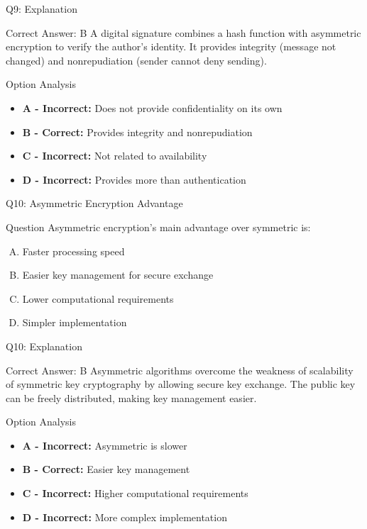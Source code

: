 \documentclass{beamer}
\begin{document}
	\begin{frame}{Q9: Explanation}
		\begin{block}{Correct Answer: B}
			A digital signature combines a hash function with asymmetric encryption to verify the author's identity. It provides integrity (message not changed) and nonrepudiation (sender cannot deny sending).
		\end{block}
		\begin{block}{Option Analysis}
			\begin{itemize}
				\item \textbf{A - Incorrect:} Does not provide confidentiality on its own
				\item \textbf{B - Correct:} Provides integrity and nonrepudiation
				\item \textbf{C - Incorrect:} Not related to availability
				\item \textbf{D - Incorrect:} Provides more than authentication
			\end{itemize}
		\end{block}
	\end{frame}
	
	\begin{frame}{Q10: Asymmetric Encryption Advantage}
		\begin{block}{Question}
			Asymmetric encryption's main advantage over symmetric is:
		\end{block}
		\begin{enumerate}[(A)]
			\item Faster processing speed
			\item Easier key management for secure exchange
			\item Lower computational requirements
			\item Simpler implementation
		\end{enumerate}
	\end{frame}
	
	\begin{frame}{Q10: Explanation}
		\begin{block}{Correct Answer: B}
			Asymmetric algorithms overcome the weakness of scalability of symmetric key cryptography by allowing secure key exchange. The public key can be freely distributed, making key management easier.
		\end{block}
		\begin{block}{Option Analysis}
			\begin{itemize}
				\item \textbf{A - Incorrect:} Asymmetric is slower
				\item \textbf{B - Correct:} Easier key management
				\item \textbf{C - Incorrect:} Higher computational requirements
				\item \textbf{D - Incorrect:} More complex implementation
			\end{itemize}
		\end{block}
	\end{frame}
	
\end{document}
